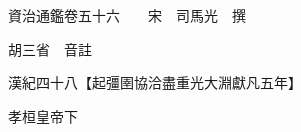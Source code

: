 










 


 
 


 

  
  
  
  
  





  
  
  
  
  
 
  

  

  
  
  



  

 
 

  
   




  

  
  


  　　資治通鑑卷五十六　　宋　司馬光　撰

　　胡三省　音註

　　漢紀四十八【起彊圉協洽盡重光大淵獻凡五年】

　　孝桓皇帝下

